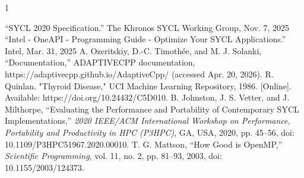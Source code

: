 \documentclass[journal]{IEEEtran}
\begin{document}
\begin{thebibliography}{1}

\bibitem{}“SYCL 2020 Specification.” The Khronos SYCL Working Group, Nov. 7, 2025 
\bibitem{}“Intel - OneAPI - Programming Guide - Optimize Your SYCL Applications.” Intel, Mar. 31, 2025 
\bibitem{}A. Ozeritskiy, D.-C. Timothée, and M. J. Solanki, “Documentation,” ADAPTIVECPP documentation, https://adaptivecpp.github.io/AdaptiveCpp/ (accessed Apr. 20, 2026).
\bibitem{}R. Quinlan. "Thyroid Disease," UCI Machine Learning Repository, 1986. [Online]. Available: https://doi.org/10.24432/C5D010.
\bibitem{}B. Johnston, J. S. Vetter, and J. Milthorpe, ``Evaluating the 
Performance and Portability of Contemporary SYCL Implementations,'' 
\textit{2020 IEEE/ACM International Workshop on Performance, Portability 
and Productivity in HPC (P3HPC)}, GA, USA, 2020, pp. 45--56, 
doi: 10.1109/P3HPC51967.2020.00010.
\bibitem{}T. G. Mattson, ``How Good is OpenMP,'' 
\textit{Scientific Programming}, vol. 11, no. 2, 
pp. 81--93, 2003, doi: 10.1155/2003/124373.

\end{thebibliography}
\end{document}
